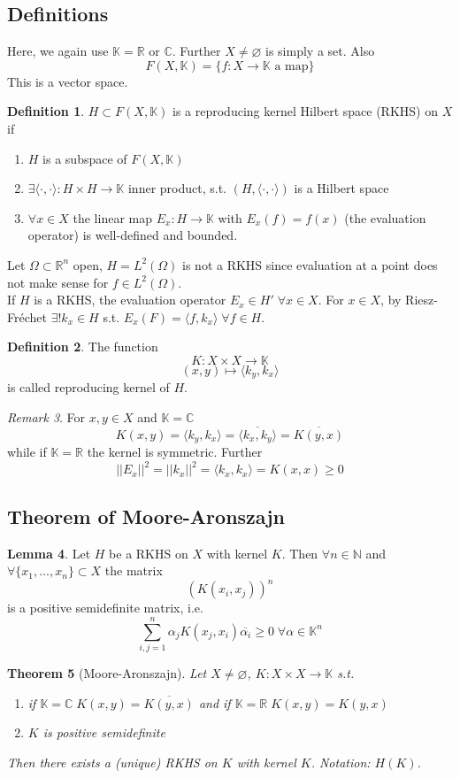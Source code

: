\documentclass[a4paper, 12pt]{article}
\theoremstyle{plain}
\newtheorem{theorem}{Theorem}[subsection] %
\theoremstyle{definition}
\newtheorem{definition}[theorem]{Definition} %
\theoremstyle{lemma}
\newtheorem{lemma}[theorem]{Lemma}
\theoremstyle{remark}
\newtheorem{remark}[theorem]{Remark}
\theoremstyle{corollary}
\theoremstyle{example}
\begin{document}
	\subsection{Definitions}
	Here, we again use $\mathbb{K} = \mathbb{R}$ or $\mathbb{C}$. Further $X\neq \varnothing$ is simply a set. Also \[F(X,\mathbb{K}) = \{f: X \to \mathbb{K} \text{ a map}\}\]
	This is a vector space.
	\begin{definition}
		$H\subset F(X,\mathbb{K})$ is a reproducing kernel Hilbert space (RKHS) on $X$ if \begin{enumerate}
			\item $H$ is a subspace of $F(X,\mathbb{K})$
			\item $\exists \langle \cdot , \cdot \rangle: H\times H \to \mathbb{K}$ inner product, s.t. $(H,\langle \cdot, \cdot \rangle)$ is a Hilbert space
			\item $\forall x \in X$ the linear map $E_x: H\to \mathbb{K}$ with $E_x(f) = f(x)$ (the evaluation operator) is well-defined and bounded. 
		\end{enumerate}
	\end{definition}
	Let $\Omega \subset \mathbb{R}^n$ open, $H = L^2(\Omega)$ is not a RKHS since evaluation at a point does not make sense for $f \in L^2(\Omega)$.\\
	If $H$ is a RKHS, the evaluation operator $E_x \in H' \; \forall x \in X$. For $x \in X$, by Riesz-Fréchet $\exists! k_x \in H$ s.t. $E_x(F) = \langle f,k_x\rangle \; \forall f \in H$.
	\begin{definition}
		The function \[K:X\times X \to \mathbb{K}\]\[(x,y) \mapsto \langle k_y, k_x\rangle\]
		is called reproducing kernel of $H$. 
	\end{definition}
	\begin{remark}
		For $x,y \in X$ and $\mathbb{K} = \mathbb{C}$ \[K(x,y) = \langle k_y,k_x\rangle = \overline{\langle k_x,k_y\rangle} = \overline{K(y,x)}\] while if $\mathbb{K} = \mathbb{R}$ the kernel is symmetric. Further \[||E_x||^2 = ||k_x||^2 = \langle k_x,k_x\rangle = K(x,x) \geq 0\]
	\end{remark}
	\subsection{Theorem of Moore-Aronszajn}
	\begin{lemma}
		Let $H$ be a RKHS on $X$ with kernel $K$. Then $\forall n \in \mathbb{N}$ and $\forall \{x_1,...,x_n\}\subset X$ the matrix \[(K(x_i,x_j))^n\] is a positive semidefinite matrix, i.e. \[\sum_{i,j=1}^n \alpha_j K(x_j,x_i)\overline{\alpha_i} \geq 0 \; \forall \alpha \in \mathbb{K}^n\]
	\end{lemma}
	\begin{theorem}[Moore-Aronszajn]
		Let $X \neq \varnothing$, $K:X\times X \to \mathbb{K}$ s.t. \begin{enumerate}
			\item if $\mathbb{K} = \mathbb{C} \; K(x,y) = \overline{K(y,x)}$ and if $\mathbb{K} = \mathbb{R} \; K(x,y) = K(y,x) $
			\item $K$ is positive semidefinite 
		\end{enumerate}
		Then there exists a (unique) RKHS on $K$ with kernel $K$. Notation: $H(K)$.
	\end{theorem}
\end{document}

